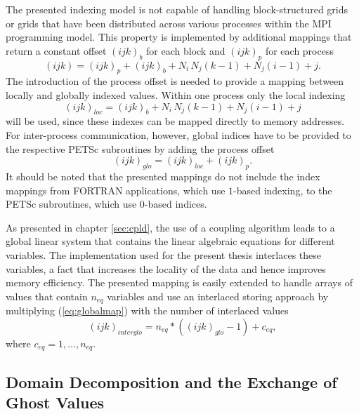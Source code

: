 The presented indexing model is not capable of handling block-structured grids or grids that have been distributed across various processes within the MPI programming model. This property is implemented by additional mappings that return a constant offset \((ijk)_b\) for each block and \((ijk)_p\) for each process
\begin{displaymath}
  (ijk) = (ijk)_p + (ijk)_b +  N_i \, N_j \left(k - 1\right) + N_j \left(i - 1\right) + j.
\end{displaymath}
The introduction of the process offset is needed to provide a mapping between locally and globally indexed values. Within one process only the local indexing 
\begin{displaymath}
  (ijk)_{loc} = (ijk)_b +  N_i \, N_j \left(k - 1\right) + N_j \left(i - 1\right) + j
\end{displaymath}
will be used, since these indexes can be mapped directly to memory addresses. For inter-process communication, however, global indices have to be provided to the respective PETSc subroutines by adding the process offset
\begin{equation}
  \label{eq:globalmap}
  (ijk)_{glo} = (ijk)_{loc} + (ijk)_p.
\end{equation}
It should be noted that the presented mappings do not include the index mappings from FORTRAN applications, which use \(1\)-based indexing, to the PETSc subroutines, which use \(0\)-based indices.

As presented in chapter \ref{sec:cpld}, the use of a coupling algorithm leads to a global linear system that contains the linear algebraic equations for different variables. The implementation used for the present thesis interlaces these variables, a fact that increases the locality of the data and hence improves memory efficiency. The presented mapping is easily extended to handle arrays of values that contain \(n_{eq}\) variables and use an interlaced storing approach by multiplying (\ref{eq:globalmap}) with the number of interlaced values
\begin{displaymath}
  (ijk)_{interglo} = n_{eq} * \left( (ijk)_{glo}  - 1 \right) + c_{eq},
\end{displaymath}
where \(c_{eq} = 1,\dots,n_{eq} \).

\subsection{Domain Decomposition and the Exchange of Ghost Values}

